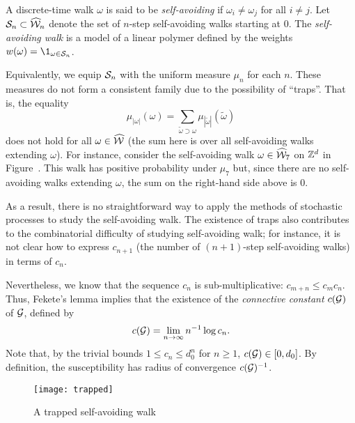 \begin{example}
A discrete-time walk $\omega$ is said to be \emph{self-avoiding} if
$\omega_i \ne \omega_j$
for all $i \ne j$. Let $\mathcal{S}_n \subset \widehat{\mathcal{W}}_n$ denote the set of $n$-step
self-avoiding walks starting at $0$.
The \emph{self-avoiding walk} is a model of a linear polymer
defined by the weights $w(\omega) = \1_{\omega\in\Scal_n}$.

Equivalently, we equip $\mathcal{S}_n$ with the uniform measure $\mu_n$ for each $n$.
These measures do not form a consistent family due to the possibility of ``traps''. That is, the equality
\begin{equation}
\mu_{|\omega|}(\omega) = \sum_{\tilde\omega \supset \omega} \mu_{|\tilde\omega|}(\tilde\omega)
\end{equation}
does not hold for all $\omega\in\widehat{\mathcal{W}}$ (the sum here is over all self-avoiding walks extending $\omega$).
For instance, consider the self-avoiding walk $\omega\in\widehat{\mathcal{W}}_7$
on ${ {{\mathbb Z}}^d }$ in Figure~\REF. %
This walk has positive probability under $\mu_7$ but,
since there are no self-avoiding walks extending $\omega$, the sum on the 
right-hand side above is $0$.

As a result, there is no straightforward way to apply the methods of stochastic processes
to study the self-avoiding walk. The existence of traps also contributes to the
combinatorial difficulty of studying self-avoiding walk; for instance, it is
not clear how to express $c_{n+1}$ (the number of $(n+1)$-step self-avoiding walks)
in terms of $c_n$.

Nevertheless, we know that the sequence $c_n$ is sub-multiplicative: $c_{m+n} \le c_m c_n$.
Thus, Fekete's lemma \REF implies that the existence of the \emph{connective constant}
$c(\mathcal{G})$ of $\mathcal{G}$, defined by
\begin{equation}
c(\mathcal{G}) = \lim_{n\rightarrow\infty} n^{-1} \log c_n.
\end{equation}
Note that, by the trivial bounds $1 \le c_n \le d_0^n$ for $n \ge 1$, $c(\mathcal{G}) \in [0, d_0]$.
By definition, the susceptibility has radius of convergence $c(\mathcal{G})^{-1}$.
\begin{figure}[!htb]
\label{fig:trap}
\centering
\caption{A trapped self-avoiding walk}
\texttt{[image: trapped]}
\end{figure}
\end{example}


